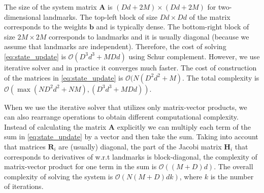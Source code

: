 The size of the system matrix $\mathbf{A}$ is
$(Dd + 2M) \times (Dd + 2M)$ for two-dimensional landmarks.
The top-left block of size $Dd \times Dd $ of the matrix corresponds
to the weights ${\bm b}$ and is typically dense.
The bottom-right block of size $2M \times 2M$ corresponds
to landmarks and it is usually diagonal
(because we assume that landmarks are independent).
Therefore, the cost of solving \eqref{eq:state_update}
is $\mathcal{O}(D^3d^3 + MDd)$ using Schur complement.
However, we use iterative solver and in practice it converges
much faster.
The cost of construction of the matrices in \eqref{eq:state_update}
is $\mathcal{O}(N(D^2d^2 + M)$.
The total complexity is
$\mathcal{O}(\max (ND^2d^2 + NM), (D^3d^3 + MDd))$.

When we use the iterative solver that utilizes only matrix-vector
products, we can also rearrange operations to obtain different
computational complexity.
Instead of calculating the matrix $\mathbf{A}$ explicitly
we can multiply each term of the sum in \eqref{eq:state_update}
by a vector and then take the sum.
Taking into account that matrices $\mathbf{R}_i$ are (usually)
diagonal, the part of the Jacobi matrix $\mathbf{H}_i$ that
corresponds to derivatives of w.r.t landmarks is block-diagonal,
the complexity of matrix-vector product for one term in the sum
is $\mathcal{O}((M + D)d)$.
The overall complexity of solving the system is
$\mathcal{O}(N(M + D)d k)$, where $k$ is the number of iterations.


